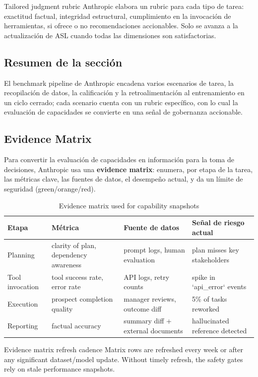 \begin{knowledgebox}{Tailored judgment rubric}
Anthropic elabora un rubric para cada tipo de tarea: exactitud factual, integridad estructural, cumplimiento en la invocación de herramientas, si ofrece o no recomendaciones accionables. Solo se avanza a la actualización de ASL cuando todas las dimensiones son satisfactorias.
\end{knowledgebox}

\subsection{Resumen de la sección}

El benchmark pipeline de Anthropic encadena varios escenarios de tarea, la recopilación de datos, la calificación y la retroalimentación al entrenamiento en un ciclo cerrado; cada scenario cuenta con un rubric específico, con lo cual la evaluación de capacidades se convierte en una señal de gobernanza accionable.

\subsection{Evidence Matrix}

Para convertir la evaluación de capacidades en información para la toma de decisiones, Anthropic usa una \textbf{evidence matrix}: enumera, por etapa de la tarea, las métricas clave, las fuentes de datos, el desempeño actual, y da un límite de seguridad (green/orange/red).

\begin{table}[H]
\centering
\begin{tabular}{p{}p{}p{}p{}}
\toprule
Etapa & Métrica & Fuente de datos & Señal de riesgo actual \\
\midrule
Planning & clarity of plan, dependency awareness & prompt logs, human evaluation & plan misses key stakeholders \\
Tool invocation & tool success rate, error rate & API logs, retry counts & spike in `api\_error` events \\
Execution & prospect completion quality & manager reviews, outcome diff & 5\% of tasks reworked \\
Reporting & factual accuracy & summary diff + external documents & hallucinated reference detected \\
\bottomrule
\end{tabular}
\caption{Evidence matrix used for capability snapshots}
\end{table}

\begin{warningbox}{Evidence matrix refresh cadence}
Matrix rows are refreshed every week or after any significant dataset/model update. Without timely refresh, the safety gates rely on stale performance snapshots.
\end{warningbox}
